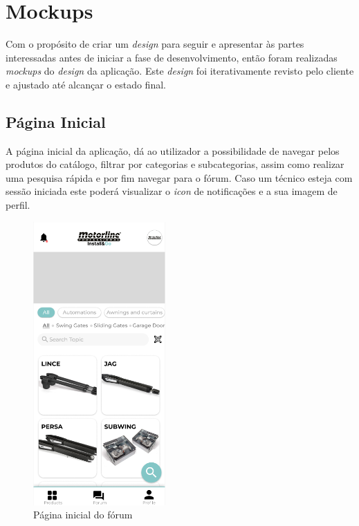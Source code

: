 \section{Mockups}
Com o propósito de criar um \textit{design} para seguir e apresentar às partes interessadas antes de iniciar a fase de desenvolvimento, então foram realizadas \textit{mockups} do \textit{design} da aplicação. Este \textit{design} foi iterativamente revisto pelo cliente e ajustado até alcançar o estado final.

\subsection{Página Inicial}

A página inicial da aplicação, dá ao utilizador a possibilidade de navegar pelos produtos do catálogo, filtrar por categorias e subcategorias, assim como realizar uma pesquisa rápida e por fim navegar para o fórum. Caso um técnico esteja com sessão iniciada este poderá visualizar o \textit{icon} de notificações e a sua imagem de perfil.

\begin{figure}[htb]
    \centering
    \includegraphics[width=0.45\textwidth]{images/mockups/home_screen.png}
    \caption{Página inicial do fórum}
    \label{fig:23}
\end{figure}

